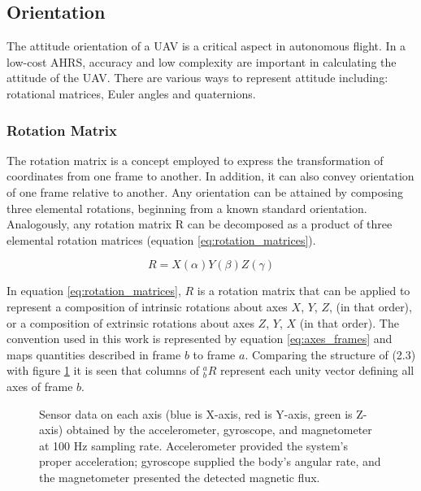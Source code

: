 \subsection{Orientation}

The attitude orientation of a UAV is a critical aspect in autonomous flight. In a low-cost
AHRS, accuracy and low complexity are important in calculating the attitude of the UAV.
There are various ways to represent attitude including: rotational matrices, Euler angles and quaternions.

\subsubsection{Rotation Matrix}

The rotation matrix is a concept employed to express the transformation of coordinates from one frame to another. In addition, it can also convey orientation of one frame relative to another. Any orientation can be attained by composing three elemental rotations, beginning from a known standard orientation. Analogously, any rotation matrix R can be decomposed as a product of three elemental rotation matrices (equation \ref{eq:rotation_matrices}).

\begin{equation}
    R = X(\alpha)Y(\beta)Z(\gamma)
    \label{eq:rotation_matrices}
\end{equation}

In equation \ref{eq:rotation_matrices}, $R$ is a rotation matrix that can be applied to represent a composition of intrinsic rotations about axes $X$, $Y$, $Z$, (in that order), or a composition of extrinsic rotations about axes $Z$, $Y$, $X$ (in that order). The convention used in this work is represented by equation \ref{eq:axes_frames} and maps quantities described in frame $b$ to frame $a$. Comparing the structure of (2.3) with figure \ref{fig:axes_frames} it is seen that columns of $^a_bR$ represent each unity vector defining all axes of frame $b$.


\begin{figure}[!h]
    \centering
    \resizebox{0.49\linewidth}{!}{}
    \resizebox{0.49\linewidth}{!}{}
    \caption{Sensor data on each axis (blue is X-axis, red is Y-axis, green is Z-axis) obtained by the accelerometer, gyroscope, and magnetometer at 100 Hz sampling rate. Accelerometer provided the system’s proper acceleration; gyroscope supplied the body’s angular rate, and the magnetometer presented the detected magnetic flux.}
    \label{fig:axes_frames}
\end{figure}


